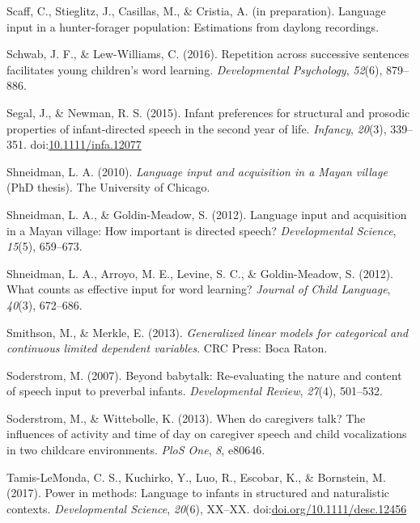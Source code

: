 \documentclass[floatsintext,man]{apa6}
\theoremstyle{definition}
\theoremstyle{definition}
\theoremstyle{definition}
\theoremstyle{remark}
\begin{document}
\hypertarget{ref-scaffIPlanguage}{}
Scaff, C., Stieglitz, J., Casillas, M., \& Cristia, A. (in preparation).
Language input in a hunter-forager population: Estimations from daylong
recordings.

\hypertarget{ref-schwab2016repetition}{}
Schwab, J. F., \& Lew-Williams, C. (2016). Repetition across successive
sentences facilitates young children's word learning.
\emph{Developmental Psychology}, \emph{52}(6), 879--886.

\hypertarget{ref-segal2015infant}{}
Segal, J., \& Newman, R. S. (2015). Infant preferences for structural
and prosodic properties of infant-directed speech in the second year of
life. \emph{Infancy}, \emph{20}(3), 339--351.
doi:\href{https://doi.org/10.1111/infa.12077}{10.1111/infa.12077}

\hypertarget{ref-shneidman2010language}{}
Shneidman, L. A. (2010). \emph{Language input and acquisition in a Mayan
village} (PhD thesis). The University of Chicago.

\hypertarget{ref-shneidman2012language}{}
Shneidman, L. A., \& Goldin-Meadow, S. (2012). Language input and
acquisition in a Mayan village: How important is directed speech?
\emph{Developmental Science}, \emph{15}(5), 659--673.

\hypertarget{ref-shneidman2012counts}{}
Shneidman, L. A., Arroyo, M. E., Levine, S. C., \& Goldin-Meadow, S.
(2012). What counts as effective input for word learning? \emph{Journal
of Child Language}, \emph{40}(3), 672--686.

\hypertarget{ref-smithson2013generalized}{}
Smithson, M., \& Merkle, E. (2013). \emph{Generalized linear models for
categorical and continuous limited dependent variables}. CRC Press: Boca
Raton.

\hypertarget{ref-soderstrom2007beyond}{}
Soderstrom, M. (2007). Beyond babytalk: Re-evaluating the nature and
content of speech input to preverbal infants. \emph{Developmental
Review}, \emph{27}(4), 501--532.

\hypertarget{ref-soderstrom2013when}{}
Soderstrom, M., \& Wittebolle, K. (2013). When do caregivers talk? The
influences of activity and time of day on caregiver speech and child
vocalizations in two childcare environments. \emph{PloS One}, \emph{8},
e80646.

\hypertarget{ref-tamislemonda2017power}{}
Tamis-LeMonda, C. S., Kuchirko, Y., Luo, R., Escobar, K., \& Bornstein,
M. (2017). Power in methods: Language to infants in structured and
naturalistic contexts. \emph{Developmental Science}, \emph{20}(6),
XX--XX.
doi:\href{https://doi.org/doi.org/10.1111/desc.12456}{doi.org/10.1111/desc.12456}
\end{document}
